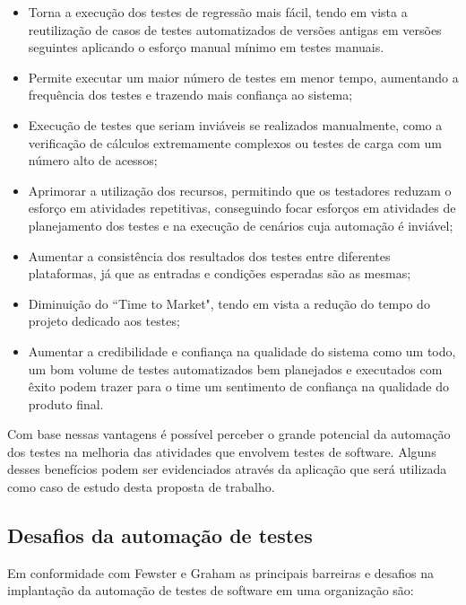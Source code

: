 \begin{itemize}
	\item Torna a execução dos testes de regressão mais fácil, tendo em vista a reutilização de casos de testes automatizados de versões antigas em versões seguintes aplicando o esforço manual mínimo em testes manuais.
	\item Permite executar um maior número de testes em menor tempo, aumentando a frequência dos testes e trazendo mais confiança ao sistema;
	\item Execução de testes que seriam inviáveis se realizados manualmente, como a verificação de cálculos extremamente complexos ou testes de carga com um número alto de acessos;
	\item Aprimorar a utilização dos recursos, permitindo que os testadores reduzam o esforço em atividades repetitivas, conseguindo focar esforços em atividades de planejamento dos testes e na execução de cenários cuja automação é inviável;
	\item  Aumentar a consistência dos resultados dos testes entre diferentes plataformas, já que as entradas e condições esperadas são as mesmas;
	\item Diminuição do ``Time to Market", tendo em vista a redução do tempo do projeto dedicado aos testes;
	\item Aumentar a credibilidade e confiança na qualidade do sistema como um todo, um bom volume de testes automatizados bem planejados e executados com êxito podem trazer para o time um sentimento de confiança na qualidade do produto final.
\end{itemize}

Com base nessas vantagens é possível perceber o grande potencial da automação dos testes na melhoria das atividades que envolvem testes de software. Alguns desses benefícios podem ser evidenciados através da aplicação que será utilizada como caso de estudo desta proposta de trabalho.

\subsection{Desafios da automação de testes}

Em conformidade com Fewster e Graham \cite{Fewster1999} as principais barreiras e desafios na implantação da automação de testes de software em uma organização são:

